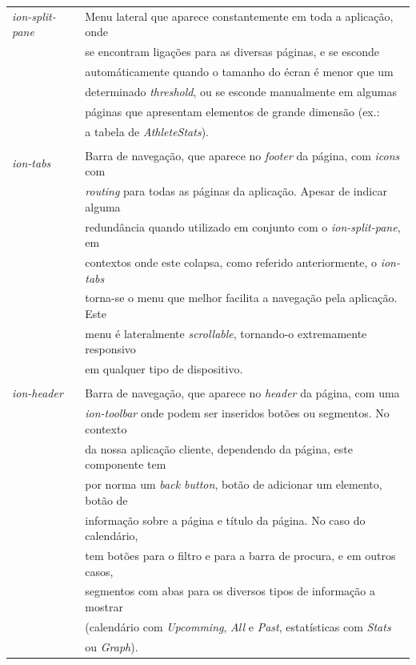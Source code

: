 \begin{tabular}{ll}
	\textit{ion-split-pane} & Menu lateral que aparece constantemente em toda a aplicação, onde \\
	&se encontram ligações para as diversas páginas, e se esconde \\
	&automáticamente quando o tamanho do écran é menor que um \\
	&determinado \textit{threshold}, ou se esconde manualmente em algumas \\
	&páginas que apresentam elementos de grande dimensão (ex.: \\
	&a tabela de \textit{AthleteStats}).\\
	\\
	\textit{ion-tabs} & Barra de navegação, que aparece no \textit{footer} da página, com \textit{icons} com \\ &\textit{routing} para todas as páginas da aplicação. Apesar de indicar alguma \\
	&redundância quando utilizado em conjunto com o \textit{ion-split-pane}, em \\
	&contextos onde este colapsa, como referido anteriormente, o \textit{ion-tabs} \\
	&torna-se o menu que melhor facilita a navegação pela aplicação. Este \\
	&menu é lateralmente \textit{scrollable}, tornando-o extremamente responsivo \\
	&em qualquer tipo de dispositivo.\\
	\\
	\textit{ion-header} & Barra de navegação, que aparece no \textit{header} da página, com uma \\
	&\textit{ion-toolbar} onde podem ser inseridos botões ou segmentos. No contexto \\
	&da nossa aplicação cliente, dependendo da página, este componente tem \\
	&por norma um \textit{back button}, botão de adicionar um elemento, botão de \\
	&informação sobre a página e título da página. No caso do calendário, \\
	&tem botões para o filtro e para a barra de procura, e em outros casos, \\
	&segmentos com abas para os diversos tipos de informação a mostrar \\
	&(calendário com \textit{Upcomming}, \textit{All} e \textit{Past}, estatísticas com \textit{Stats} \\
	&ou \textit{Graph}).\\
\end{tabular}

